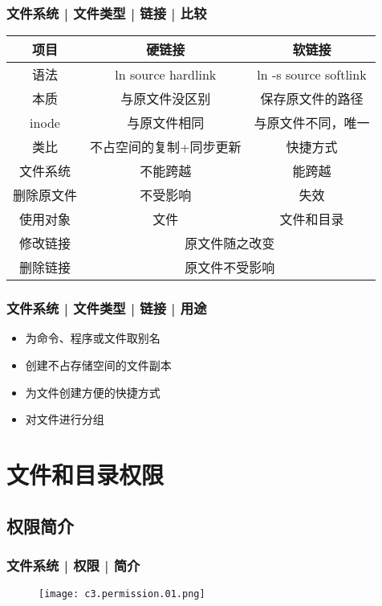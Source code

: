 \begin{frame}
  \frametitle{文件系统 | 文件类型 | 链接 | \alert{比较}}
  \begin{table}
    \centering
    \begin{tabularx}{0.94\textwidth}{ccc}
      \hline
      \rowcolor{blue!50}项目 & 硬链接 & 软链接\\
      \hline
      语法 & ln source hardlink & ln -s source softlink\\
      本质 & 与原文件没区别 & 保存原文件的路径\\
      inode & 与原文件相同 & 与原文件不同，唯一\\
      类比 & 不占空间的复制+同步更新 & 快捷方式\\
      文件系统 & 不能跨越 & 能跨越\\
      删除原文件 & 不受影响 & 失效\\
      使用对象 & 文件 & 文件和目录\\
      \hline
      修改链接 & \multicolumn{2}{c}{原文件随之改变}\\
      删除链接 & \multicolumn{2}{c}{原文件不受影响}\\
      \hline
    \end{tabularx}
  \end{table}
\end{frame}

\begin{frame}
  \frametitle{文件系统 | 文件类型 | 链接 | 用途}
  \begin{itemize}
    \item 为命令、程序或文件取别名
    \item 创建不占存储空间的文件副本
    \item 为文件创建方便的快捷方式
    \item 对文件进行分组
  \end{itemize}
\end{frame}

\section{文件和目录权限}
\subsection{权限简介}
\begin{frame}
  \frametitle{文件系统 | 权限 | \alert{简介}}
  \begin{figure}
    \centering
    \texttt{[image: c3.permission.01.png]}
  \end{figure}
\end{frame}

